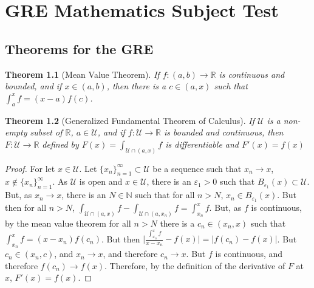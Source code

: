 \documentclass[crop=false,class=book]{standalone}
\theoremstyle{mystyle}
\newtheorem{theorem}{Theorem}[section]
\begin{document}
\chapter{GRE Mathematics Subject Test}
\section{Theorems for the GRE}
\begin{theorem}[Mean Value Theorem]
If $f:(a,b)\rightarrow \mathbb{R}$ is continuous and bounded, and if $x\in (a,b)$, then there is a $c\in(a,x)$ such that $\int_{a}^{x}f = (x-a)f(c)$.
\end{theorem}
\begin{theorem}[Generalized Fundamental Theorem of Calculus]
If $\mathcal{U}$ is a non-empty subset of $\mathbb{R}$, $a\in \mathcal{U}$, and if $f:\mathcal{U}\rightarrow \mathbb{R}$ is bounded and continuous, then $F:\mathcal{U}\rightarrow \mathbb{R}$ defined by $F(x) = \int_{\mathcal{U}\cap (a,x)}f$ is differentiable and $F'(x) = f(x)$
\end{theorem}
\begin{proof}
For let $x\in \mathcal{U}$. Let $\{x_n\}_{n=1}^{\infty}\subset \mathcal{U}$ be a sequence such that $x_n \rightarrow x$, $x\notin \{x_n\}_{n=1}^{\infty}$. As $\mathcal{U}$ is open and $x\in \mathcal{U}$, there is an $\varepsilon_1>0$ such that $B_{\varepsilon_1}(x)\subset \mathcal{U}$. But, as $x_n\rightarrow x$, there is an $N\in \mathbb{N}$ such that for all $n>N$, $x_n\in B_{\varepsilon_1}(x)$. But then for all $n>N$, $\int_{\mathcal{U}\cap(a,x)}f - \int_{\mathcal{U}\cap(a,x_n)}f = \int_{x_n}^{x}f$. But, as $f$ is continuous, by the mean value theorem for all $n>N$ there is a $c_n\in (x_n,x)$ such that $\int_{x_n}^{x}f = (x-x_n)f(c_n)$. But then $\big|\frac{\int_{x_n}^{x}f}{x-x_n} - f(x)| = |f(c_n)-f(x)|$. But $c_n \in (x_n,c)$, and $x_n \rightarrow x$, and therefore $c_n \rightarrow x$. But $f$ is continuous, and therefore $f(c_n)\rightarrow f(x)$. Therefore, by the definition of the derivative of $F$ at $x$, $F'(x) = f(x)$. 
\end{proof}
\end{document}
